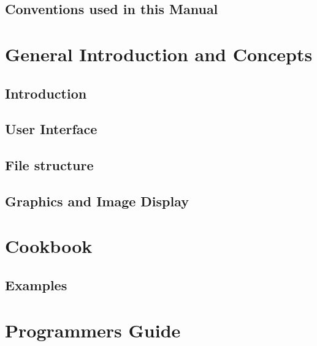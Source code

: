 \documentclass[headsepline,normalheadings]{book}
\begin{document}
\chapter*{Conventions used in this Manual}
 
\cleardoublepage
{}
\part{General Introduction and Concepts}
\chapter                {Introduction}
 
\cleardoublepage
\chapter                {User Interface}
 
\cleardoublepage
\chapter                {File structure}

\cleardoublepage
\chapter                {Graphics and Image Display}
 
\part{Cookbook}
\cleardoublepage
\chapter                {Examples}
 
\part{Programmers Guide}
\end{document}
